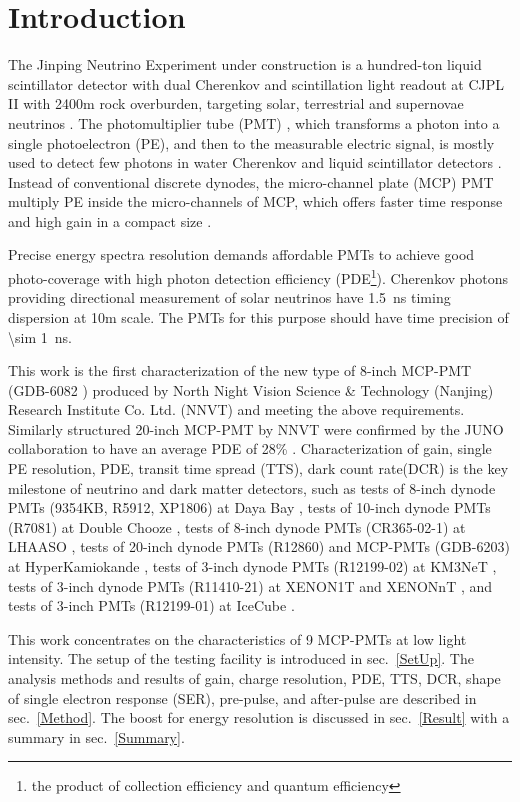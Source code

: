 \section{Introduction}
The Jinping Neutrino Experiment under construction is a hundred-ton liquid scintillator detector with dual Cherenkov and scintillation light readout
 at CJPL II with 2400m rock overburden, targeting solar, terrestrial and supernovae neutrinos \cite{LetterJNE2017}.
The photomultiplier tube (PMT) \cite{HAMAMATSUManual}, which transforms a photon into a single photoelectron (PE), and then to the measurable electric signal, is mostly used to detect few photons in water Cherenkov \cite{SNO,SuperK} and liquid scintillator detectors \cite{KamLAND,JUNO:2015zny}. Instead of conventional discrete dynodes, the micro-channel plate (MCP) PMT multiply PE inside the micro-channels of MCP, which offers faster time response and high gain in a compact size \cite{HAMAMATSUManual}.

Precise energy spectra resolution demands affordable PMTs to achieve good photo-coverage with high photon detection efficiency (PDE\footnote{the product of collection efficiency and quantum efficiency}). Cherenkov photons providing directional measurement of solar neutrinos have \SI{1.5}{ns} timing dispersion at 10m scale. The PMTs for this purpose should have time precision of \SI{\sim 1}{ns}.


This work is the first characterization of
 the new type of 8-inch MCP-PMT (GDB-6082 \cite{GDB-6082}) produced by North Night Vision Science \& Technology (Nanjing) Research Institute Co. Ltd. (NNVT) and meeting the above requirements. %
Similarly structured 20-inch MCP-PMT by NNVT were confirmed by the JUNO collaboration to have an average PDE of 28\% \cite{JUNOMassTesting}.
Characterization of gain, single PE resolution, PDE, transit time spread (TTS), dark count rate(DCR) is the key milestone of neutrino and dark matter detectors, such as tests of
 8-inch dynode PMTs (9354KB, R5912, XP1806) at Daya Bay \cite{DayaBayTesting}, tests of 10-inch dynode PMTs (R7081) at Double Chooze \cite{DoubleChoozeTesting}, tests of 8-inch dynode PMTs (CR365-02-1) at LHAASO \cite{LHAASOTesting}, tests of 20-inch dynode PMTs (R12860) and MCP-PMTs (GDB-6203) at HyperKamiokande \cite{HyperKTesting}, tests of 3-inch dynode PMTs (R12199-02) at KM3NeT \cite{KM3NetTesting}, tests of 3-inch dynode PMTs (R11410-21) at XENON1T and XENONnT \cite{XENON1TTesting}\cite{XENONnTTesting}, and tests of 3-inch PMTs (R12199-01) at IceCube \cite{IceCubeTesting}.

This work concentrates on the characteristics of 9 MCP-PMTs at low light intensity. The setup of the testing facility is introduced in sec.~\ref{SetUp}. The analysis methods and results of gain, charge resolution, PDE, TTS, DCR, shape of single electron response (SER), pre-pulse, and after-pulse are described in sec.~\ref{Method}. The boost for energy resolution is discussed in sec.~\ref{Result} with a summary in sec.~\ref{Summary}.

